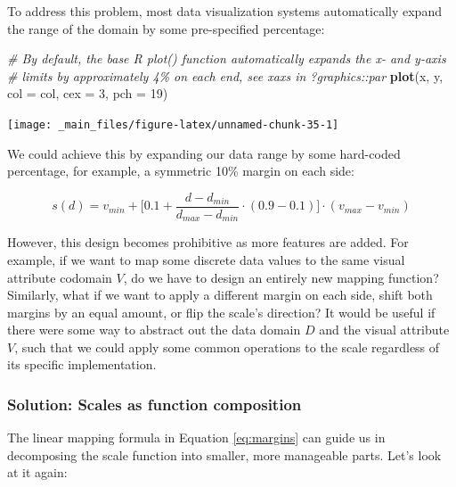 \documentclass[
]{book}
\newenvironment{Shaded}{\begin{snugshade}}{\end{snugshade}}
\newcommand{\AttributeTok}[1]{\textcolor[rgb]{0.13,0.29,0.53}{#1}}
\newcommand{\CommentTok}[1]{\textcolor[rgb]{0.56,0.35,0.01}{\textit{#1}}}
\newcommand{\DecValTok}[1]{\textcolor[rgb]{0.00,0.00,0.81}{#1}}
\newcommand{\FunctionTok}[1]{\textcolor[rgb]{0.13,0.29,0.53}{\textbf{#1}}}
\newcommand{\NormalTok}[1]{#1}
\theoremstyle{definition}
\theoremstyle{definition}
\theoremstyle{definition}
\theoremstyle{definition}
\theoremstyle{remark}
\begin{document}
To address this problem, most data visualization systems automatically expand the range of the domain by some pre-specified percentage:

\begin{Shaded}
\begin{Highlighting}[]
\CommentTok{\# By default, the base R plot() function automatically expands the x{-} and y{-}axis}
\CommentTok{\# limits by approximately 4\% on each end, see \textasciigrave{}xaxs\textasciigrave{} in ?graphics::par}
\FunctionTok{plot}\NormalTok{(x, y, }\AttributeTok{col =}\NormalTok{ col, }\AttributeTok{cex =} \DecValTok{3}\NormalTok{, }\AttributeTok{pch =} \DecValTok{19}\NormalTok{)}
\end{Highlighting}
\end{Shaded}

\begin{center}\texttt{[image: \_main\_files/figure-latex/unnamed-chunk-35-1]} \end{center}

We could achieve this by expanding our data range by some hard-coded percentage, for example, a symmetric 10\% margin on each side:

\begin{equation}

  s(d) = v_{min} + \bigg[ 0.1 + \frac{d - d_{min}}{d_{max} - d_{min}} \cdot (0.9 - 0.1) 
            \bigg] \cdot (v_{max} - v_{min}) 
  \label{eq:margins}

\end{equation}

However, this design becomes prohibitive as more features are added. For example, if we want to map some discrete data values to the same visual attribute codomain \(V\), do we have to design an entirely new mapping function? Similarly, what if we want to apply a different margin on each side, shift both margins by an equal amount, or flip the scale's direction? It would be useful if there were some way to abstract out the data domain \(D\) and the visual attribute \(V\), such that we could apply some common operations to the scale regardless of its specific implementation.

\subsubsection{Solution: Scales as function composition}\label{scales-composition}

The linear mapping formula in Equation \eqref{eq:margins} can guide us in decomposing the scale function into smaller, more manageable parts. Let's look at it again:
\end{document}
